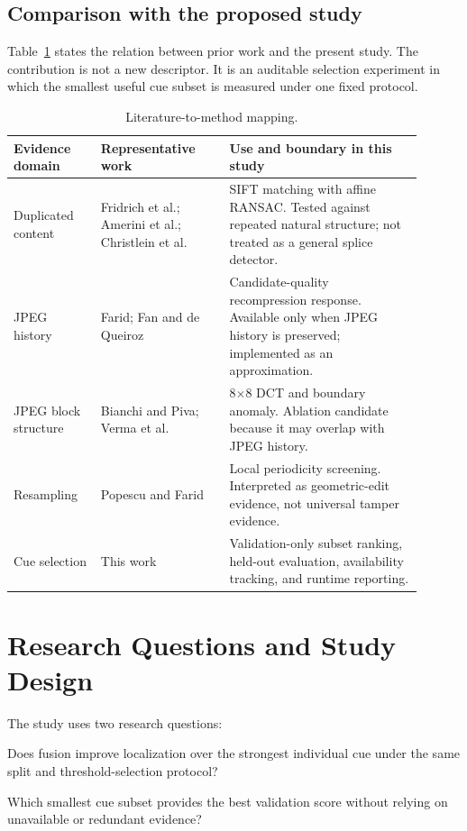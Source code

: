 \documentclass[sigconf,nonacm]{acmart}
\begin{document}
\subsection{Comparison with the proposed study}
Table~\ref{tab:related} states the relation between prior work and the present study. The contribution is not a new descriptor. It is an auditable selection experiment in which the smallest useful cue subset is measured under one fixed protocol.

\begin{table}[t]
\caption{Literature-to-method mapping.}\label{tab:related}\small
\begin{tabular}{p{0.19\linewidth}p{0.29\linewidth}p{0.42\linewidth}}
\toprule Evidence domain & Representative work & Use and boundary in this study \\
\midrule
Duplicated content & Fridrich et al.; Amerini et al.; Christlein et al. & SIFT matching with affine RANSAC. Tested against repeated natural structure; not treated as a general splice detector. \\
JPEG history & Farid; Fan and de Queiroz & Candidate-quality recompression response. Available only when JPEG history is preserved; implemented as an approximation. \\
JPEG block structure & Bianchi and Piva; Verma et al. & 8$\times$8 DCT and boundary anomaly. Ablation candidate because it may overlap with JPEG history. \\
Resampling & Popescu and Farid & Local periodicity screening. Interpreted as geometric-edit evidence, not universal tamper evidence. \\
Cue selection & This work & Validation-only subset ranking, held-out evaluation, availability tracking, and runtime reporting. \\
\bottomrule
\end{tabular}
\end{table}

\section{Research Questions and Study Design}
The study uses two research questions:
\begin{description}[leftmargin=!,labelwidth=1.2cm]
  \item[RQ1] Does fusion improve localization over the strongest individual cue under the same split and threshold-selection protocol?
  \item[RQ2] Which smallest cue subset provides the best validation score without relying on unavailable or redundant evidence?
\end{description}
\end{document}
